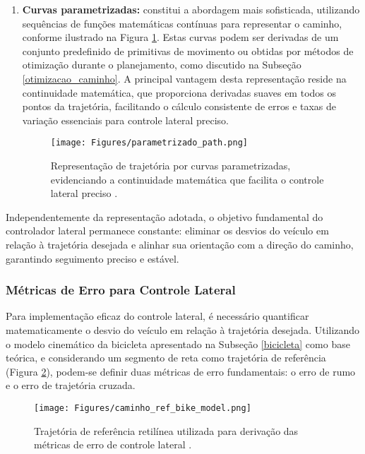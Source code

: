 \begin{enumerate}
    \item \textbf{Curvas parametrizadas:} constitui a abordagem mais sofisticada, utilizando sequências de funções matemáticas contínuas para representar o caminho, conforme ilustrado na Figura \ref{parametrizado_path}. Estas curvas podem ser derivadas de um conjunto predefinido de primitivas de movimento ou obtidas por métodos de otimização durante o planejamento, como discutido na Subseção \ref{otimizacao_caminho}. A principal vantagem desta representação reside na continuidade matemática, que proporciona derivadas suaves em todos os pontos da trajetória, facilitando o cálculo consistente de erros e taxas de variação essenciais para controle lateral preciso.
    
    \begin{figure}[H]
    \centering
    \texttt{[image: Figures/parametrizado\_path.png]}
    \caption{Representação de trajetória por curvas parametrizadas, evidenciando a continuidade matemática que facilita o controle lateral preciso \cite[Week 6 - Lesson 1: Introduction to Lateral Vehicle Control.  ~3min30s]{University_of_Toronto2018-fe}.}
    \label{parametrizado_path}
    \end{figure}
\end{enumerate}

Independentemente da representação adotada, o objetivo fundamental do controlador lateral permanece constante: eliminar os desvios do veículo em relação à trajetória desejada e alinhar sua orientação com a direção do caminho, garantindo seguimento preciso e estável.

\subsubsection*{Métricas de Erro para Controle Lateral}

Para implementação eficaz do controle lateral, é necessário quantificar matematicamente o desvio do veículo em relação à trajetória desejada. Utilizando o modelo cinemático da bicicleta apresentado na Subseção \ref{bicicleta} como base teórica, e considerando um segmento de reta como trajetória de referência (Figura \ref{caminho_ref_bike_model}), podem-se definir duas métricas de erro fundamentais: o erro de rumo e o erro de trajetória cruzada.

\begin{figure}[H]
\centering
\texttt{[image: Figures/caminho\_ref\_bike\_model.png]}
\caption{Trajetória de referência retilínea utilizada para derivação das métricas de erro de controle lateral \cite[Week 6 - Lesson 1: Introduction to Lateral Vehicle Control.  ~6min23s]{University_of_Toronto2018-fe}.}
\label{caminho_ref_bike_model}
\end{figure}


